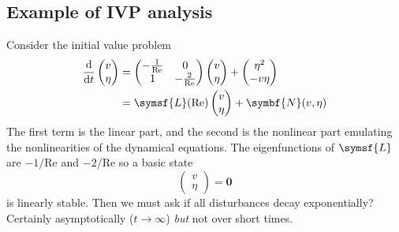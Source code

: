 \documentclass{jknotes}
\newcommand{\ReN}{\text{Re}}
\begin{document}
\subsection{Example of IVP analysis}
\label{sec:eg}
Consider the initial value problem
\begin{align}
	\frac{\diffd}{\diffd t} \begin{pmatrix} v \\ \eta \end{pmatrix} &=
	\begin{pmatrix} -\frac{1}{\ReN} & 0 \\ 1 & -\frac{2}{\ReN} \end{pmatrix}
	\begin{pmatrix} v \\ \eta \end{pmatrix} + \begin{pmatrix} \eta^2 \\ -v\eta
\end{pmatrix}\label{eq:l9:1} \\
	&= \symsf{L}(\ReN) \begin{pmatrix} v \\ \eta \end{pmatrix} + \symbf{N}(v,
	\eta)
\end{align}
The first term is the linear part, and the second is the nonlinear part
emulating the nonlinearities of the dynamical equations. The eigenfunctions of
$\symsf{L}$ are $-1/\ReN$ and $-2/\ReN$ so a basic state
\begin{equation}
	\begin{pmatrix} v \\ \eta \end{pmatrix} = \symbf{0}
\end{equation}
is linearly stable. Then we must ask if all disturbances decay exponentially?
Certainly asymptotically ($t \to \infty$) \emph{but} not over short times. 
\end{document}
